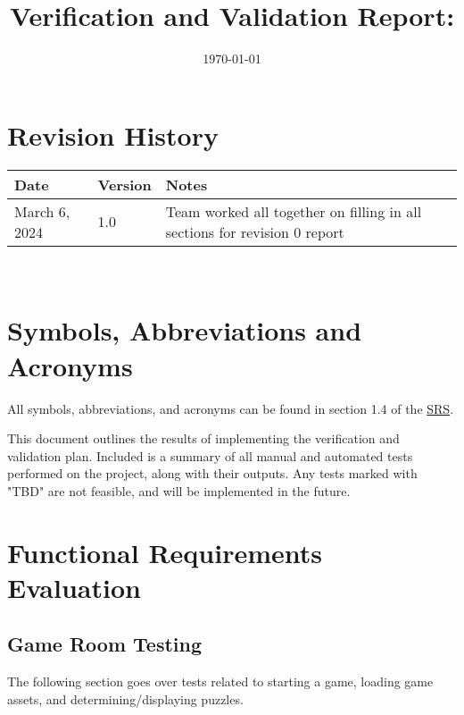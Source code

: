 \documentclass[12pt, titlepage]{article}
\begin{document}
\title{Verification and Validation Report: \progname} 
\author{\authname}
\date{\today}
	
\maketitle


\section{Revision History}

\begin{tabularx}{\textwidth}{p{3cm}p{2cm}X}
\toprule {\bf Date} & {\bf Version} & {\bf Notes}\\
\midrule
March 6, 2024 & 1.0 & Team worked all together on filling in all sections for revision 0 report\\
\bottomrule
\end{tabularx}

~\newpage

\section{Symbols, Abbreviations and Acronyms}

\renewcommand{\arraystretch}{1.2}
All  symbols, abbreviations, and acronyms can be found in section 1.4 of the  \href{https://github.com/SammyG7/Mac-AR/blob/main/docs/SRS/SRS.pdf}{SRS}.


\newpage

\tableofcontents

\listoftables %

\newpage


This document outlines the results of implementing the verification and validation plan. Included is a summary of all manual and automated tests performed on the project, along with their outputs. Any tests marked with "TBD" are not feasible, and will be implemented in the future. 

\section{Functional Requirements Evaluation}

\subsection{Game Room Testing}
The following section goes over tests related to starting a game, loading game assets, and determining/displaying puzzles.
\end{document}
